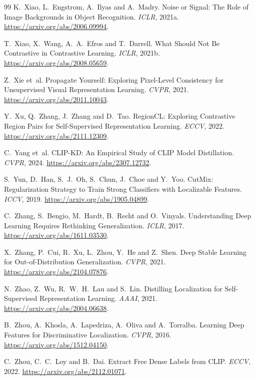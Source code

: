 \documentclass[11pt]{article}
\begin{document}
\begin{thebibliography}{99}
K.~Xiao, L.~Engstrom, A.~Ilyas and A.~Madry. Noise or Signal: The Role of Image Backgrounds in Object Recognition.
\emph{ICLR}, 2021a. \url{https://arxiv.org/abs/2006.09994}.

T.~Xiao, X.~Wang, A.~A.~Efros and T.~Darrell. What Should Not Be Contrastive in Contrastive Learning. \emph{ICLR}, 2021b.
\url{https://arxiv.org/abs/2008.05659}.

Z.~Xie et~al. Propagate Yourself: Exploring Pixel-Level Consistency for Unsupervised Visual Representation Learning.
\emph{CVPR}, 2021. \url{https://arxiv.org/abs/2011.10043}.

Y.~Xu, Q.~Zhang, J.~Zhang and D.~Tao. RegionCL: Exploring Contrastive Region Pairs for Self-Supervised Representation
Learning. \emph{ECCV}, 2022. \url{https://arxiv.org/abs/2111.12309}.

C.~Yang et~al. CLIP-KD: An Empirical Study of CLIP Model Distillation. \emph{CVPR}, 2024.
\url{https://arxiv.org/abs/2307.12732}.

S.~Yun, D.~Han, S.~J.~Oh, S.~Chun, J.~Choe and Y.~Yoo. CutMix: Regularization Strategy to Train Strong Classifiers with
Localizable Features. \emph{ICCV}, 2019. \url{https://arxiv.org/abs/1905.04899}.

C.~Zhang, S.~Bengio, M.~Hardt, B.~Recht and O.~Vinyals. Understanding Deep Learning Requires Rethinking Generalization.
\emph{ICLR}, 2017. \url{https://arxiv.org/abs/1611.03530}.

X.~Zhang, P.~Cui, R.~Xu, L.~Zhou, Y.~He and Z.~Shen. Deep Stable Learning for Out-of-Distribution Generalization.
\emph{CVPR}, 2021. \url{https://arxiv.org/abs/2104.07876}.

N.~Zhao, Z.~Wu, R.~W.~H.~Lau and S.~Lin. Distilling Localization for Self-Supervised Representation Learning.
\emph{AAAI}, 2021. \url{https://arxiv.org/abs/2004.06638}.

B.~Zhou, A.~Khosla, A.~Lapedriza, A.~Oliva and A.~Torralba. Learning Deep Features for Discriminative Localization.
\emph{CVPR}, 2016. \url{https://arxiv.org/abs/1512.04150}.

C.~Zhou, C.~C.~Loy and B.~Dai. Extract Free Dense Labels from CLIP. \emph{ECCV}, 2022.
\url{https://arxiv.org/abs/2112.01071}.


\end{thebibliography}
\end{document}
